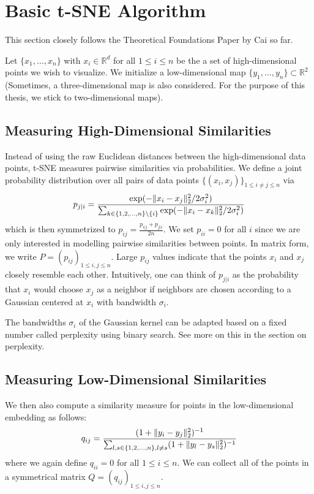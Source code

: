 \section{Basic t-SNE Algorithm}
This section closely follows the Theoretical Foundations Paper by Cai \cite{JMLR:v23:21-0524} so far. 

Let $\{x_1, \dots , x_n \}$ with $x_i \in \mathbb{R}^d$ for all $1 \leq i \leq n$ be the a set of high-dimensional points we wish to visualize. We initialize a low-dimensional map $\{y_1, \dots , y_n\} \subset \mathbb{R}^2$ (Sometimes, a three-dimensional map is also considered. For the purpose of this thesis, we stick to two-dimensional maps). 

\subsection{Measuring High-Dimensional Similarities}

Instead of using the raw Euclidean distances between the high-dimensional data points, t-SNE measures pairwise similarities via probabilities. 
We define a joint probability distribution over all pairs of data points $\{(x_i, x_j)\}_{1 \leq i \neq j \leq n}$ via  
\begin{equation}
    p_{j|i} =  \frac{\exp(-\lVert x_i - x_j\rVert_2^2 / 2\sigma_i^2)}{\sum_{k \in \{1,2, \dots, n\} \backslash \{i\}} \exp({-\lVert x_i - x_k\rVert_2^2 / 2 \sigma_i^2})}
\end{equation}
which is then symmetrized to $p_{ij} = \frac{p_{i|j} + p_{j|i}}{2n}$. We set $p_{ii}=0$ for all $i$ since we are only interested in modelling pairwise similarities between points. In matrix form, we write $P = (p_{ij})_{1 \leq i, j \leq n}$. 
Large $p_{ij}$ values indicate that the points $x_i$ and $x_j$ closely resemble each other. 
Intuitively, one can think of $p_{j|i}$ as the probability that $x_i$ would choose $x_j$ as a neighbor if neighbors are chosen according to a Gaussian centered at $x_i$ with bandwidth $\sigma_i$. 

The bandwidths $\sigma_i$ of the Gaussian kernel can be adapted based on a fixed number called perplexity using binary search. See more on this in the section on perplexity. 

\subsection{Measuring Low-Dimensional Similarities}

We then also compute a similarity measure for points in the low-dimensional embedding as follows: 
\begin{equation}
    q_{ij} = \frac{(1+ \lVert y_i - y_j\rVert_2^2)^{-1}}{\sum_{l, s \in \{1,2, \dots, n \}, l \neq s } (1+\lVert y_l - y_s\rVert_2^2)^{-1}}
\end{equation}
where we again define $q_{ii} = 0$ for all $1 \leq i \leq n$. We can collect all of the points in a symmetrical matrix $Q = (q_{ij})_{1 \leq i, j \leq n}$. 

